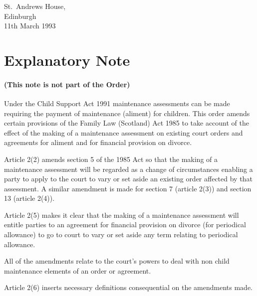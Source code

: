 \documentclass[a4paper]{article}
\newcommand{\parthead}{}
\begin{document}
\noindent
St.\ Andrews House,\\
Edinburgh\\
11th March 1993

\part{Explanatory Note}

\renewcommand\parthead{--- Explanatory Note}

\subsection*{(This note is not part of the Order)}

Under the Child Support Act 1991 maintenance assessments can be made requiring the payment of maintenance (aliment) for children. This order amends certain provisions of the Family Law (Scotland) Act 1985 to take account of the effect of the making of a maintenance assessment on existing court orders and agreements for aliment and for financial provision on divorce.

  Article 2(2) amends section 5 of the 1985 Act so that the making of a maintenance assessment will be regarded as a change of circumstances enabling a party to apply to the court to vary or set aside an existing order affected by that assessment. A similar amendment is made for section 7 (article 2(3)) and section 13 (article 2(4)).

  Article 2(5) makes it clear that the making of a maintenance assessment will entitle parties to an agreement for financial provision on divorce (for periodical allowance) to go to court to vary or set aside any term relating to periodical allowance.

  All of the amendments relate to the court’s powers to deal with non child maintenance elements of an order or agreement.

  Article 2(6) inserts necessary definitions consequential on the amendments made.
\end{document}
